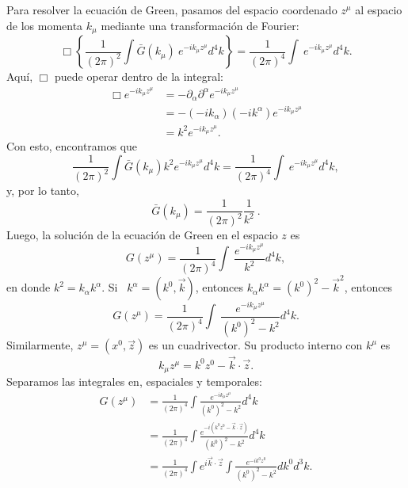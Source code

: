  Para resolver la ecuación de Green, pasamos del espacio
 coordenado $z^\mu $ al espacio de los momenta $k_\mu $ mediante
 una transformación
 de Fourier:%
 \begin{equation}
 \Box\left\{  \frac{1}{(2\pi)
 ^2}\int\bar{G}\left( k_\mu \right)
 ~e^{-ik_\mu z^\mu }d^4k\right\}  =\frac{1}{\left( 2\pi\right)
 ^4}\int~e^{-ik_\mu z^\mu }d^4k.
 \end{equation}
 Aquí, $\Box$ puede operar dentro de la integral:%
 \begin{align*}
 \Box e^{-ik_\mu z^\mu }  &
 =-\partial_{\alpha}\partial^{\alpha}e^{-ik_\mu z^\mu }\\
 & =-\left(  -ik_{\alpha}\right)  \left(
 -ik^{\alpha}\right)e^{-ik_\mu z^\mu }\\
 & =k^2e^{-ik_\mu z^\mu }.
 \end{align*}
 Con esto, encontramos que
 \begin{equation}
 \frac{1}{(2\pi)  ^2}\int\bar{G}\left(k_\mu \right)
 k^2e^{-ik_\mu z^\mu }d^4k=\frac{1}{(2\pi)  ^4}%
 \int~e^{-ik_\mu z^\mu }d^4k,
 \end{equation}
 y, por lo tanto,
 \begin{equation}
 \bar{G}\left(  k_\mu \right)  =\frac{1}{(2\pi)
 ^2}\frac {1}{k^2}~.
 \end{equation}
 Luego, la solución de la ecuación de Green en el espacio $z$ es
 \begin{equation}
 G(z^\mu)  =\frac{1}{(2\pi)  ^4}\int
 ~\frac{e^{-ik_\mu z^\mu }}{k^2}d^4k,
 \end{equation}
 en donde $k^2=k_{\alpha}k^{\alpha}$. Si \ $k^{\alpha}=(k^0,\vec{k}) $,
 entonces
 $k_{\alpha}k^{\alpha}=(k^0)^2-\vec{k}^2$, entonces
 \begin{equation}
 G(z^\mu)  =\frac{1}{(2\pi)  ^4}\int
 ~\frac{e^{-ik_\mu z^\mu }}{(k^0)^2-k^2}d^4k.
 \end{equation}
 Similarmente, $z^\mu =(x^0,\vec{z})  $ es un cuadrivector. Su producto interno
 con $k^\mu$ es
 \begin{equation}
 k_\mu z^\mu =k^0z^0-\vec{k}\cdot\vec{z}.
 \end{equation}
 Separamos las integrales en, espaciales y temporales:%
 \begin{align}
 G(z^\mu)    & =\frac{1}{\left(
 2\pi\right)^4}\int\frac{e^{-ik_\mu z^\mu }}{(k^0)^2-k^2}d^4k\nonumber\\
 & =\frac{1}{(2\pi)
 ^4}\int\frac{e^{-i\left(k^0z^0-\vec{k}\cdot\vec{z}\right)
 }}{(k^0)^2-k^2}d^4k\nonumber\\
 & =\frac{1}{(2\pi) ^4}\int e^{i\vec{k}\cdot\vec{z}}\int\frac
 {e^{-ik^0 z^0}}{(k^0)^2-k^2}dk^0d^3k.\label{R-rela02}%
 \end{align}

